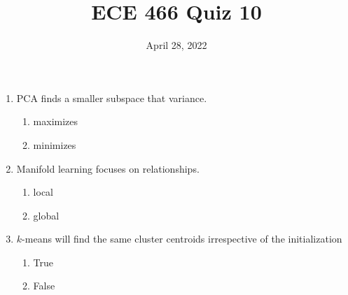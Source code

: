 \documentclass{article}
\date{April 28, 2022}
\begin{document}
 
\title{ECE 466 Quiz 10}
 
\maketitle
 
\begin{enumerate}
    \item PCA finds a smaller subspace that \underline{\hspace{3em}} variance.
    \begin{enumerate}
        \item maximizes
        \item minimizes
    \end{enumerate}
    
    \item Manifold learning focuses on  \underline{\hspace{3em}} relationships.
    \begin{enumerate}
        \item local
        \item global
    \end{enumerate}

    \item $k$-means will find the same cluster centroids irrespective of the initialization
    \begin{enumerate}
        \item True
        \item False
    \end{enumerate}

\end{enumerate}
\end{document}
